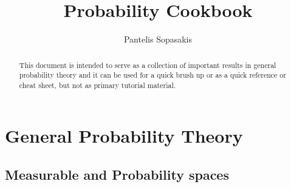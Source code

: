 \documentclass[a4paper,10pt]{article}
\title{Probability Cookbook}
\author{Pantelis Sopasakis}
\begin{document}
\maketitle
\tableofcontents

\begin{abstract}
 This document is intended to serve as a collection of important results in general probability
 theory and it can be used for a quick brush up or as a quick reference or 
 cheat sheet, but not as primary tutorial material.
\end{abstract}

\section{General Probability Theory}

\subsection{Measurable and Probability spaces}
\end{document}
